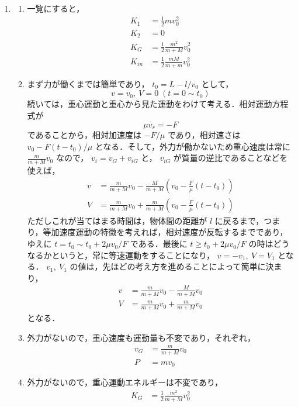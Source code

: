 \documentclass[
  b4paperpaper,
  xelatex,ja=standard]{bxjsbook}
\providecommand{\tightlist}{%
  \setlength{\itemsep}{0pt}\setlength{\parskip}{0pt}}\usepackage{longtable,booktabs,array}
\begin{document}
\begin{enumerate}
\def\labelenumi{\arabic{enumi}.}
\item
  \begin{enumerate}
  \def\labelenumii{\arabic{enumii}.}
  \tightlist
  \item
    一覧にすると， \begin{align*}
     K_1&=\frac{1}{2}mv_0^2\\
     K_2&=0\\
     K_G&=\frac{1}{2}\frac{m^2}{m+M}v_0^2\\
     K_{in}&=\frac{1}{2}\frac{mM}{m+m}v_0^2
     \end{align*}
  \item
    まず力が働くまでは簡単であり， \(t_0=L-l/v_0\) として，
    \[v=v_0,\:V=0\;(t=0 \sim t_0)\]
    続いては，重心運動と重心から見た運動をわけて考える．相対運動方程式が
    \[\mu \dot{v_r}=-F\] であることから，相対加速度は \(-F/\mu\)
    であり，相対速さは \(v_0-F(t-t_0)/\mu\)
    となる．そして，外力が働かないため重心速度は常に
    \(\frac{m}{m+M}v_0\) なので， \(v_i=v_G+v_{iG}\) と， \(v_{iG}\)
    が質量の逆比であることなどを使えば， \begin{align*}
     v&=\frac{m}{m+M}v_0-\frac{M}{m+M}\left(v_0-\frac{F}{\mu}(t-t_0)\right)\\
     V&=\frac{m}{m+M}v_0+\frac{m}{m+M}\left(v_0-\frac{F}{\mu}(t-t_0)\right)
     \end{align*} ただしこれが当てはまる時間は，物体間の距離が \(l\)
    に戻るまで，つまり，等加速度運動の特徴を考えれば，相対速度が反転するまでであり，ゆえに
    \(t=t_0 \sim t_0 + 2\mu v_0/F\) である．最後に
    \(t \geq t_0 + 2\mu v_0/F\)
    の時はどうなるかというと，常に等速運動をすることになり，
    \(v=-v_1,\: V=V_1\) となる． \(v_1,\:V_1\)
    の値は，先ほどの考え方を進めることによって簡単に決まり，
    \begin{align*}
     v&=\frac{m}{m+M}v_0-\frac{M}{m+M}v_0\\
     V&=\frac{m}{m+M}v_0+\frac{m}{m+M}v_0
     \end{align*} となる．
  \item
    外力がないので，重心速度も運動量も不変であり，それぞれ，
    \begin{align*}
     v_G&=\frac{m}{m+M}v_0\\
     P&=mv_0
     \end{align*}
  \item
    外力がないので，重心運動エネルギーは不変であり， \begin{align*}
     K_G&=\frac{1}{2}\frac{m^2}{m+M}v_0^2
     \end{align*}
  \end{enumerate}
\end{enumerate}
\end{document}
